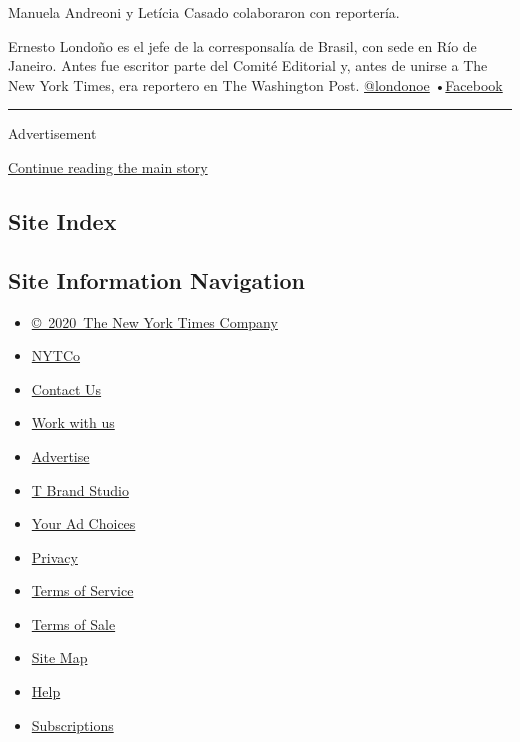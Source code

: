Manuela Andreoni y Letícia Casado colaboraron con reportería.

Ernesto Londoño es el jefe de la corresponsalía de Brasil, con sede en
Río de Janeiro. Antes fue escritor parte del Comité Editorial y, antes
de unirse a The New York Times, era reportero en The Washington Post.
\href{https://twitter.com/londonoe}{@londonoe}
•\href{https://www.facebookcorewwwi.onion/londono}{Facebook}

\begin{center}\rule{0.5\linewidth}{\linethickness}\end{center}

Advertisement

\protect\hyperlink{after-bottom}{Continue reading the main story}

\hypertarget{site-index}{%
\subsection{Site Index}\label{site-index}}

\hypertarget{site-information-navigation}{%
\subsection{Site Information
Navigation}\label{site-information-navigation}}

\begin{itemize}
\tightlist
\item
  \href{https://help.nytimes3xbfgragh.onion/hc/en-us/articles/115014792127-Copyright-notice}{©~2020~The
  New York Times Company}
\end{itemize}

\begin{itemize}
\tightlist
\item
  \href{https://www.nytco.com/}{NYTCo}
\item
  \href{https://help.nytimes3xbfgragh.onion/hc/en-us/articles/115015385887-Contact-Us}{Contact
  Us}
\item
  \href{https://www.nytco.com/careers/}{Work with us}
\item
  \href{https://nytmediakit.com/}{Advertise}
\item
  \href{http://www.tbrandstudio.com/}{T Brand Studio}
\item
  \href{https://www.nytimes3xbfgragh.onion/privacy/cookie-policy\#how-do-i-manage-trackers}{Your
  Ad Choices}
\item
  \href{https://www.nytimes3xbfgragh.onion/privacy}{Privacy}
\item
  \href{https://help.nytimes3xbfgragh.onion/hc/en-us/articles/115014893428-Terms-of-service}{Terms
  of Service}
\item
  \href{https://help.nytimes3xbfgragh.onion/hc/en-us/articles/115014893968-Terms-of-sale}{Terms
  of Sale}
\item
  \href{https://spiderbites.nytimes3xbfgragh.onion}{Site Map}
\item
  \href{https://help.nytimes3xbfgragh.onion/hc/en-us}{Help}
\item
  \href{https://www.nytimes3xbfgragh.onion/subscription?campaignId=37WXW}{Subscriptions}
\end{itemize}
